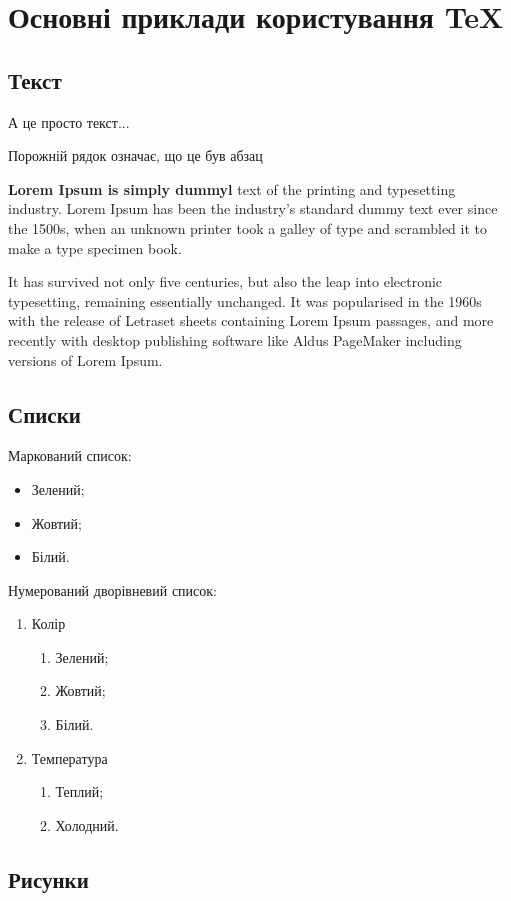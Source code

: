 \chapter{Основні приклади користування TeX}
\section{Текст}
А це просто текст...

Порожній рядок означає, що це був абзац

\textbf{Lorem Ipsum is simply dummyl}  text of the printing and typesetting industry. Lorem Ipsum has been the industry's standard dummy text ever since the 1500s, when an unknown printer took a galley of type and scrambled it to make a type specimen book. 

It has survived not only five centuries, but also the leap into electronic typesetting, remaining essentially unchanged. It was popularised in the 1960s with the release of Letraset sheets containing Lorem Ipsum passages, and more recently with desktop publishing software like Aldus PageMaker including versions of Lorem Ipsum. 

\section{Списки}
Маркований список:
\begin{itemize}
\item Зелений;
\item Жовтий;
\item Білий.
\end{itemize}

Нумерований дворівневий список:
\begin{enumerate}
\item Колір
      \begin{enumerate}
      \item Зелений;
      \item Жовтий;
      \item Білий.
      \end{enumerate}	
\item Температура
      \begin{enumerate}
      \item Теплий;
      \item Холодний.
      \end{enumerate}
\end{enumerate}
 

\section{Рисунки}


